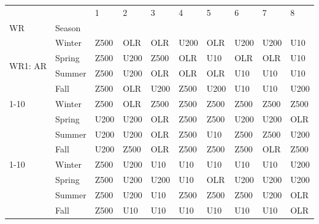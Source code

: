 \begin{tabular}{llllllllll}
\toprule
        &      &     1 &     2 &     3 &     4 &     5 &     6 &     7 &     8 \\
WR & Season &       &       &       &       &       &       &       &       \\
\midrule
\multirow{4}{*}{WR1: AR} & Winter &  Z500 &   OLR &   OLR &  U200 &   OLR &  U200 &  U200 &   U10 \\
        & Spring &  Z500 &  U200 &  Z500 &   OLR &   U10 &   OLR &   OLR &   U10 \\
        & Summer &  Z500 &  U200 &   OLR &   OLR &   OLR &   U10 &   U10 &   U10 \\
        & Fall &  Z500 &   OLR &  U200 &  Z500 &  U200 &   U10 &   U10 &  U200 \\
\cline{1-10}
\multirow{4}{*}{WR2: PT} & Winter &  Z500 &   OLR &  Z500 &  Z500 &  Z500 &  Z500 &  Z500 &  Z500 \\
        & Spring &  U200 &  U200 &   OLR &  Z500 &  Z500 &  U200 &  U200 &   OLR \\
        & Summer &  U200 &  U200 &   OLR &  Z500 &   U10 &  Z500 &  Z500 &  U200 \\
        & Fall &  U200 &  Z500 &   OLR &  Z500 &  Z500 &  Z500 &   OLR &  Z500 \\
\cline{1-10}
\multirow{4}{*}{WR3: GH} & Winter &  Z500 &  U200 &   U10 &   U10 &   U10 &   U10 &   U10 &  U200 \\
        & Spring &  Z500 &  U200 &  U200 &   U10 &   OLR &  U200 &  U200 &  U200 \\
        & Summer &  Z500 &  U200 &   U10 &  Z500 &  Z500 &  Z500 &  U200 &   OLR \\
        & Fall &  Z500 &   U10 &   U10 &   U10 &   U10 &   U10 &   U10 &   OLR \\
\bottomrule
\end{tabular}
